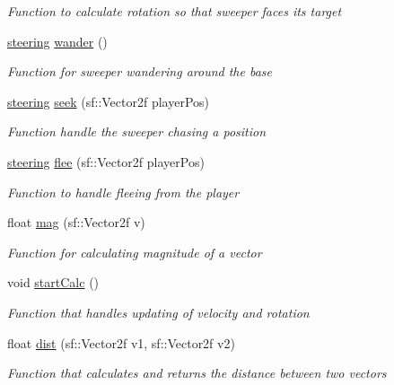\begin{DoxyCompactItemize}
\begin{DoxyCompactList}\small\item\em Function to calculate rotation so that sweeper faces its target \end{DoxyCompactList}\item 
\mbox{\hyperlink{structsteering}{steering}} \mbox{\hyperlink{class_enemy_a1b465f7bfba7a4aeb0f5be904dfba900}{wander}} ()
\begin{DoxyCompactList}\small\item\em Function for sweeper wandering around the base \end{DoxyCompactList}\item 
\mbox{\hyperlink{structsteering}{steering}} \mbox{\hyperlink{class_enemy_afdb365396a2ce0849e81ca838038a78c}{seek}} (sf\+::\+Vector2f player\+Pos)
\begin{DoxyCompactList}\small\item\em Function handle the sweeper chasing a position \end{DoxyCompactList}\item 
\mbox{\hyperlink{structsteering}{steering}} \mbox{\hyperlink{class_enemy_abf2799c252b07c51054dea9b6d5cdfee}{flee}} (sf\+::\+Vector2f player\+Pos)
\begin{DoxyCompactList}\small\item\em Function to handle fleeing from the player \end{DoxyCompactList}\item 
float \mbox{\hyperlink{class_enemy_a5208f54e3db5885caef976f25802f938}{mag}} (sf\+::\+Vector2f v)
\begin{DoxyCompactList}\small\item\em Function for calculating magnitude of a vector \end{DoxyCompactList}\item 
void \mbox{\hyperlink{class_enemy_a09f98e210a7bbf73fb9e7d7ce671133e}{start\+Calc}} ()
\begin{DoxyCompactList}\small\item\em Function that handles updating of velocity and rotation \end{DoxyCompactList}\item 
float \mbox{\hyperlink{class_enemy_a20f703afc06d0024fdfad521738f9a06}{dist}} (sf\+::\+Vector2f v1, sf\+::\+Vector2f v2)
\begin{DoxyCompactList}\small\item\em Function that calculates and returns the distance between two vectors \end{DoxyCompactList}\item 

\end{DoxyCompactItemize}
